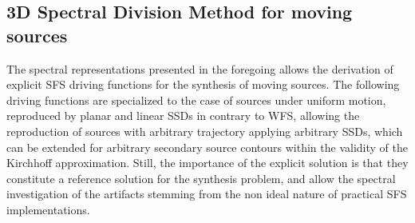 \subsection{3D Spectral Division Method for moving sources}

The spectral representations presented in the foregoing allows the derivation of explicit SFS driving functions for the synthesis of moving sources.
The following driving functions are specialized to the case of sources under uniform motion, reproduced by planar and linear SSDs in contrary to WFS, allowing the reproduction of sources with arbitrary trajectory applying arbitrary SSDs, which can be extended for arbitrary secondary source contours within the validity of the Kirchhoff approximation.
Still, the importance of the explicit solution is that they constitute a reference solution for the synthesis problem, and allow the spectral investigation of the artifacts stemming from the non ideal nature of practical SFS implementations.

